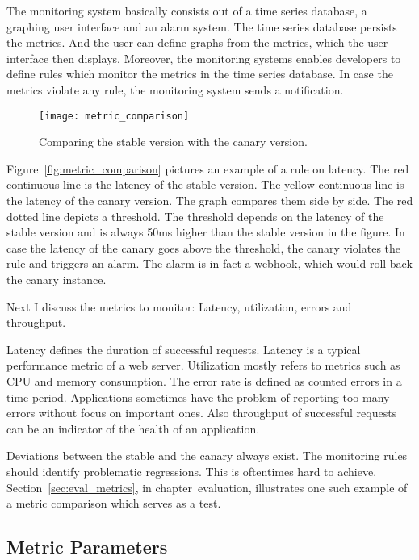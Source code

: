 The monitoring system basically consists out of a time series database, a graphing user
interface and an alarm system. The time series database persists the metrics. And the user
can define graphs from the metrics, which the user interface then displays. Moreover, the
monitoring systems enables developers to define rules which monitor the metrics in the
time series database. In case the metrics violate any rule, the monitoring system sends a
notification.

\begin{figure}[htbp]
  \centering
  \texttt{[image: metric\_comparison]}
  \caption[metric_comparison]{Comparing the stable version with the canary version.}
  \label{fig:metrics_comparison}
\end{figure}

Figure~\ref{fig:metric_comparison} pictures an example of a rule on latency. The red
continuous line is the latency of the stable version. The yellow continuous line is the
latency of the canary version. The graph compares them side by side. The red dotted line
depicts a threshold. The threshold depends on the latency of the stable version and is
always 50ms higher than the stable version in the figure. In case the latency of the
canary goes above the threshold, the canary violates the rule and triggers an alarm. The
alarm is in fact a webhook, which would roll back the canary instance.

Next I discuss the metrics to monitor: Latency, utilization, errors and throughput.

Latency defines the duration of successful requests. Latency is a typical performance
metric of a web server. Utilization mostly refers to metrics such as CPU and memory
consumption. The error rate is defined as counted errors in a time period. Applications
sometimes have the problem of reporting too many errors without focus on important
ones. Also throughput of successful requests can be an indicator of the health of an
application.

Deviations between the stable and the canary always exist. The monitoring rules should
identify problematic regressions. This is oftentimes hard to
achieve. Section~\ref{sec:eval_metrics}, in chapter~evaluation, illustrates one such
example of a metric comparison which serves as a test.

\subsection{Metric Parameters}

